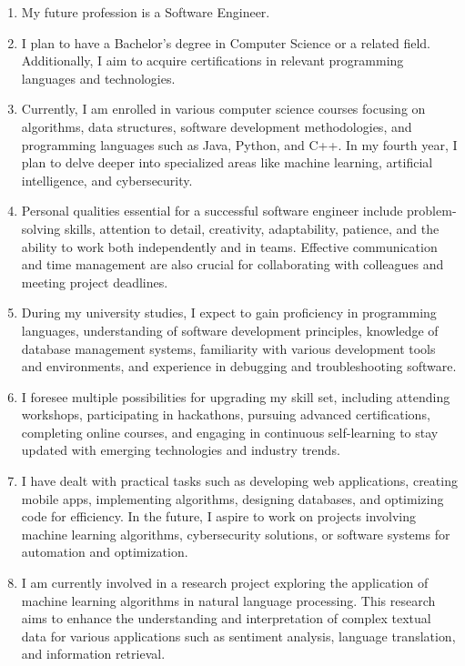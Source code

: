 \documentclass[a4paper,14pt, unknownkeysallowed]{extreport}
\begin{document}
\begin{enumerate}
	\item My future profession is a Software Engineer.
	
	\item I plan to have a Bachelor's degree in Computer Science or a related field. Additionally, I aim to acquire certifications in relevant programming languages and technologies.
	
	\item Currently, I am enrolled in various computer science courses focusing on algorithms, data structures, software development methodologies, and programming languages such as Java, Python, and C++. In my fourth year, I plan to delve deeper into specialized areas like machine learning, artificial intelligence, and cybersecurity.
	
	\item Personal qualities essential for a successful software engineer include problem-solving skills, attention to detail, creativity, adaptability, patience, and the ability to work both independently and in teams. Effective communication and time management are also crucial for collaborating with colleagues and meeting project deadlines.
	
	\item During my university studies, I expect to gain proficiency in programming languages, understanding of software development principles, knowledge of database management systems, familiarity with various development tools and environments, and experience in debugging and troubleshooting software.
	
	\item I foresee multiple possibilities for upgrading my skill set, including attending workshops, participating in hackathons, pursuing advanced certifications, completing online courses, and engaging in continuous self-learning to stay updated with emerging technologies and industry trends.
	
	\item I have dealt with practical tasks such as developing web applications, creating mobile apps, implementing algorithms, designing databases, and optimizing code for efficiency. In the future, I aspire to work on projects involving machine learning algorithms, cybersecurity solutions, or software systems for automation and optimization.
	
	\item I am currently involved in a research project exploring the application of machine learning algorithms in natural language processing. This research aims to enhance the understanding and interpretation of complex textual data for various applications such as sentiment analysis, language translation, and information retrieval.
	

\end{enumerate}
\end{document}
